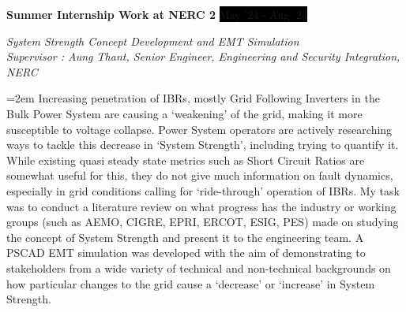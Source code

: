 \documentclass[paper=a4,fontsize=11pt]{scrartcl} %
\newcommand{\sepspace}{\vspace*{1em}}		%
\newcommand{\EducationEntry}[4]{
		\noindent \textbf{#1} \hfill      %
		\colorbox{Black}{%
			\parbox{10em}{%
			\hfill\color{White}#2}} \par  %
		\noindent \textit{#3} \par        %
		\noindent\hangindent=2em\hangafter=0 \small #4 %
		\normalsize \par}
\newcommand{\WorkEntry}[4]{				  %
		\noindent \textbf{#1} \hfill      %
		\colorbox{Black}{\color{White}#2} \par  %
		\noindent \textit{#3} \par              %
		\noindent\hangindent=2em\hangafter=0 \small #4 %
		\normalsize \par}
\begin{document}
\sepspace 

\WorkEntry{Summer Internship Work at NERC 2}{May '24 - Aug '24}{System Strength Concept Development and EMT Simulation\\ Supervisor : Aung Thant, Senior Engineer, Engineering and Security Integration, NERC}
{Increasing penetration of IBRs, mostly Grid Following Inverters in the Bulk Power System are causing a `weakening' of the grid, making it more susceptible to voltage collapse. Power System operators are actively researching ways to tackle this decrease in `System Strength', including trying to quantify it. While existing quasi steady state metrics such as Short Circuit Ratios are somewhat useful for this, they do not give much information on fault dynamics, especially in grid conditions calling for `ride-through' operation of IBRs. My task was to conduct a literature review on what progress has the industry or working groups (such as AEMO, CIGRE, EPRI, ERCOT, ESIG, PES) made on studying the concept of System Strength and present it to the engineering team. A PSCAD EMT simulation was developed with the aim of demonstrating to stakeholders from a wide variety of technical and non-technical backgrounds on how particular changes to the grid cause a `decrease' or `increase' in System Strength.}



\end{document}
